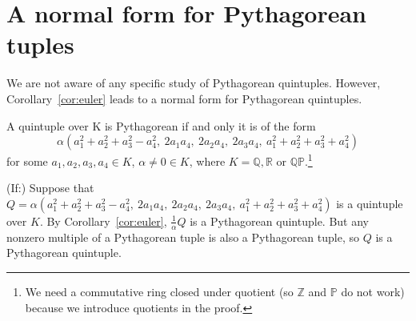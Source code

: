 \documentclass[12pt]{article}
\begin{document}



\section{A normal form for Pythagorean tuples}
\label{sec:normpyth}

We are not aware of any specific study of Pythagorean quintuples.
However, Corollary~\ref{cor:euler} leads to a normal form for Pythagorean 
quintuples.

\begin{lemma}
\label{lem:quint}
A quintuple over K is Pythagorean if and only it is of the form
\begin{equation}
\label{eq:pythquint}
	\alpha (a_1^2 + a_2^2 + a_3^2 - a_4^2,
		\ 2a_1a_4,\ 2a_2a_4,\ 2a_3a_4,
		\ a_1^2 + a_2^2 + a_3^2 + a_4^2)
\end{equation}
for some $a_1,a_2,a_3,a_4 \in K$, $\alpha\neq 0 \in K$, 
where $K = \mathbb{Q}, \mathbb{R}$ or $\mathbb{QP}$.\footnote{We need a
  commutative ring closed under quotient (so $\mathbb{Z}$ and $\mathbb{P}$ 
  do not work) because we introduce quotients in the proof.}
\end{lemma}
\prf
(If:)
Suppose that $Q = \alpha (a_1^2 + a_2^2 + a_3^2 - a_4^2,
		\ 2a_1a_4,\ 2a_2a_4,\ 2a_3a_4,
		\ a_1^2 + a_2^2 + a_3^2 + a_4^2)$ is a quintuple over $K$.
By Corollary~\ref{cor:euler}, $\frac{1}{\alpha} Q$ is a Pythagorean quintuple.
But any nonzero multiple of a Pythagorean tuple is also a Pythagorean tuple,
so $Q$ is a Pythagorean quintuple.
\end{document}
